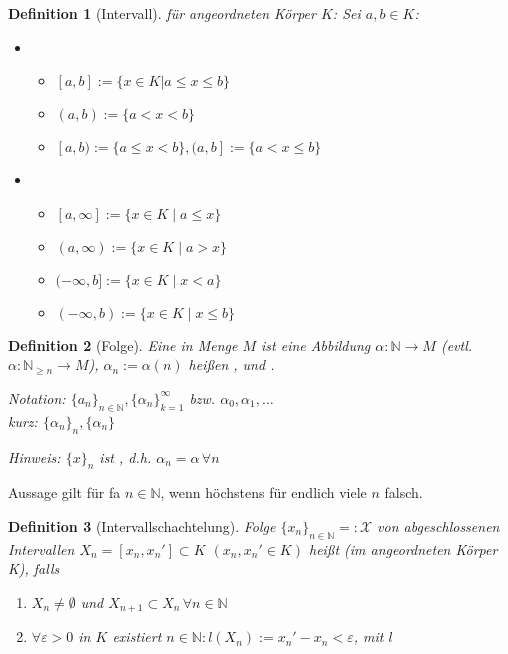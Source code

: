 \documentclass[ngerman,a4paper]{report}
\theoremstyle{break}
\newtheorem*{definition}{Definition}
\renewcommand{\epsilon}{\varepsilon}
\begin{document}
\begin{definition}[Intervall]
	 für angeordneten Körper $K$: Sei $a,b\in K$:
	\begin{itemize}
		\item {}
		\begin{itemize}
			\item $[a,b]:=\{ x\in K | a \le x \le b \}$ 
			\item $(a,b):=\{a < x < b\}$ 
			\item $[a,b) := \{a \le x < b\}, (a,b]:=\{a < x \le b\}$ 
		\end{itemize}
		\item {}
		\begin{itemize}
			\item $[a,\infty]:=\{x\in K\mid a \le x\}$
			\item $(a,\infty):=\{x\in K\mid a > x\}$
            \item $(-\infty, b]:= \{x \in K \mid x< a\}$
            \item $(-\infty, b) := \{x\in K\mid x \leq b\}$
		\end{itemize}
	\end{itemize}
\end{definition}

\begin{definition}[Folge]
    Eine  in Menge $M$ ist eine Abbildung $\alpha:\mathbb{N}\rightarrow M$ (evtl. $\alpha:\mathbb{N}_{\ge n}\rightarrow M$), $\alpha_n := \alpha(n)$ heißen , und .
    
	Notation: $\{a_n\}_{n\in\mathbb{N}}, \{\alpha_n\}_{k=1}^\infty$ bzw. $\alpha_0, \alpha_1, \dotsc$\\
	kurz: $\{\alpha_n\}_n, \{\alpha_n \}$
		
	Hinweis: $\{x\}_n$ ist , d.h. $\alpha_n = \alpha\,\forall n$
\end{definition}

Aussage gilt für \gls{fa} $n\in\mathbb{N}$, wenn höchstens für endlich viele $n$ falsch.

\begin{definition}[Intervallschachtelung]
	Folge $\{x_n\}_{n\in\mathbb{N}} =:\mathcal{X}$ von abgeschlossenen Intervallen $X_n=[x_n, x_n']\subset K$ $(x_n, x_n'\in K)$ heißt  (im angeordneten Körper K), falls
	\begin{enumerate}[label={\alph*)}]
		\item $X_n\neq \emptyset$ und $X_{n+1}\subset X_n\,\forall n\in\mathbb{N}$
		\item $\forall\epsilon > 0$ in $K$ existiert $n\in\mathbb{N}: l(X_n):= x_n' - x_n < \epsilon$, mit $l$ 
	\end{enumerate}
\end{definition}
\end{document}
